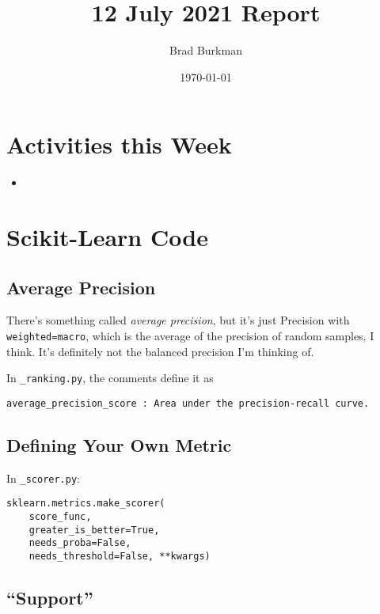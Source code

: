 \documentclass[11pt]{article}
\title{12 July 2021 Report}
\author{Brad Burkman}
\date{\today}
\begin{document}
\setlength{\parindent}{20pt}
\begin{spacing}{1.2}
\maketitle



\tableofcontents

\section{Activities this Week}

\begin{itemize}
	\item 
\end{itemize}

\section{Scikit-Learn Code}

\subsection{Average Precision}

There's something called {\it average precision}, but it's just Precision with {\tt weighted=macro}, which is the average of the precision of random samples, I think.  It's definitely not the balanced precision I'm thinking of.  

In \verb|_ranking.py|, the comments define it as  

\verb|average_precision_score : Area under the precision-recall curve.|

\subsection{Defining Your Own Metric}

In \verb|_scorer.py|:

\begin{verbatim}
sklearn.metrics.make_scorer(
    score_func, 
    greater_is_better=True,
    needs_proba=False,
    needs_threshold=False, **kwargs)
\end{verbatim}

\subsection{``Support''}


\end{spacing}
\end{document}
